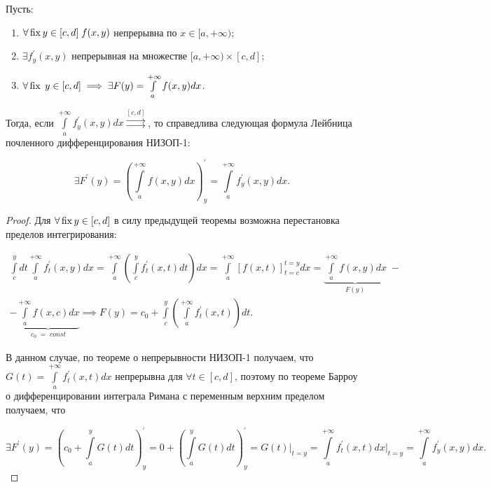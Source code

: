 \documentclass[../../main.tex]{subfiles}
\begin{document}
\begin{thm}
	Пусть: 
	\begin{enumerate}
		\item $\forall \operatorname{fix} y \in [c, d] \; f(x, y)$ непрерывна по $x \in [a, +\infty)$;
		\item $\exists f^{'}_y (x, y)$ непрерывная на множестве $[a, +\infty) \times [c, d]$;
		\item $\forall \operatorname{fix} \; y \in [c, d] \implies \exists F(y) = \int\limits_a^{+\infty} f(x, y) dx$.
	\end{enumerate}
	Тогда, если $\displaystyle \int\limits_a^{+\infty} f^{'}_y (x, y) dx \overset{[c, d]}{\rightrightarrows}$, то справедлива следующая формула Лейбница почленного дифференцирования НИЗОП-1:
	
	\begin{equation} \label{lec11:2}
		\exists F^{'}(y) = \left( \int\limits_a^{+\infty} f(x, y) dx \right)^{'}_y = \int\limits_a^{+\infty} f^{'}_y (x, y) dx. 
	\end{equation}
	
	\begin{proof}
		Для $\forall \operatorname{fix} y \in [c, d]$ в силу предыдущей теоремы возможна перестановка пределов интегрирования:
		
		\begin{equation*}
		\begin{gathered}
		\int\limits_c^y dt \int\limits_a^{+\infty} f^{'}_{t}(x, y) dx =
		\int\limits_a^{+\infty} \left( \int\limits_c^y f^{'}_{t} (x, t) dt \right) dx =
		\int\limits_a^{+\infty} \left[ f(x, t) \right]_{t = c}^{t = y} dx
		= \underbrace{\int\limits_a^{+\infty} f(x, y) dx}_{F(y)}\;- \\
		- \underbrace{\int\limits_a^{+\infty} f (x, c) dx}_{c_0\;=\;const} \implies 
		F(y) = c_0 + \int\limits_c^y \left( \int\limits_a^{+\infty} f^{'}_{t} (x, t) \right) dt.
		\end{gathered}
		\end{equation*}
		
		В данном случае, по теореме о непрерывности НИЗОП-1 получаем, что $G(t) = \int\limits_a^{+\infty} f_{t}^{'}(x, t) dx$ непрерывна для $\forall t \in [c, d]$, поэтому по теореме Барроу о дифференцировании интеграла Римана с переменным верхним пределом получаем, что
		
		\[
		\exists F^{'}(y) = \left(c_0 + \int\limits_a^y G(t)dt\right)^{'}_y = 0 + \left(\int\limits_a^y G(t)dt\right)^{'}_y = G(t)\bigg|_{t = y} = \int\limits_a^{+\infty} f^{'}_t (x, t) dx\bigg|_{t = y} = \int\limits^{+\infty}_a  f^{'}_y (x, y) dx.
		\]
	\end{proof}
	
\end{thm}
\end{document}
